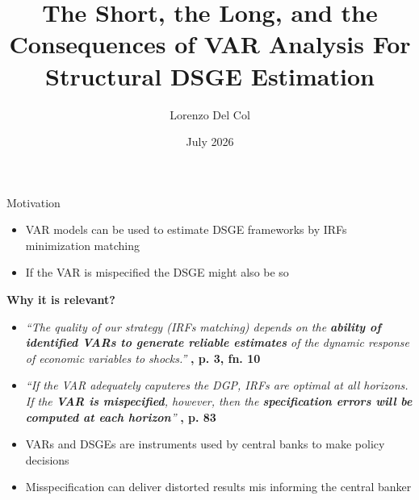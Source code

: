 \documentclass[11pt]{beamer}
\author[Del Col]{Lorenzo Del Col}
\title[Master's Thesis]{The Short, the Long, and the Consequences of VAR Analysis For Structural DSGE Estimation}
\institute[]{
    \small Supervisor: Professor Efrem Castelnuovo \\
    \vspace{0.3cm}
    \footnotesize \textit{University of Padova} \\ 
    \footnotesize \textit{MSc Applied Economics}
}
\date{July 2026}
\begin{document}

\begin{frame}
\titlepage
\end{frame}


\begin{frame}{Motivation}
    \begin{itemize}
        \item VAR models can be used to estimate DSGE frameworks by IRFs minimization matching
    \end{itemize}
    
    \begin{itemize}  
        \item If the VAR is mispecified the DSGE might also be so
    \end{itemize}
    \vspace{0.1cm}
    \pause
    
    \textbf{Why it is relevant?}
    \begin{itemize}
        \item \textit{``The quality of our strategy (IRFs matching) depends on the \textbf{ability of identified VARs to generate reliable estimates} of the dynamic response of economic variables to shocks.''}
        \vspace{0.1cm}
        \hfill {\small \textbf{\citet{ACEL2011}, p. 3, fn. 10} }
        \pause

        \item \textit{``If the VAR adequately caputeres the DGP, IRFs are optimal at all horizons. 
        \\
        If the \textbf{VAR is mispecified}, however, then the \textbf{specification errors will be computed at each horizon}''}
        \vspace{0.1cm}
        \hfill {\small \textbf{\citet{Ramey2016}, p. 83} }
        \pause
        
        \item VARs and DSGEs are instruments used by central banks to make policy decisions
        \item Misspecification can deliver distorted results mis informing the central banker
    \end{itemize}

\end{frame}
\end{document}
